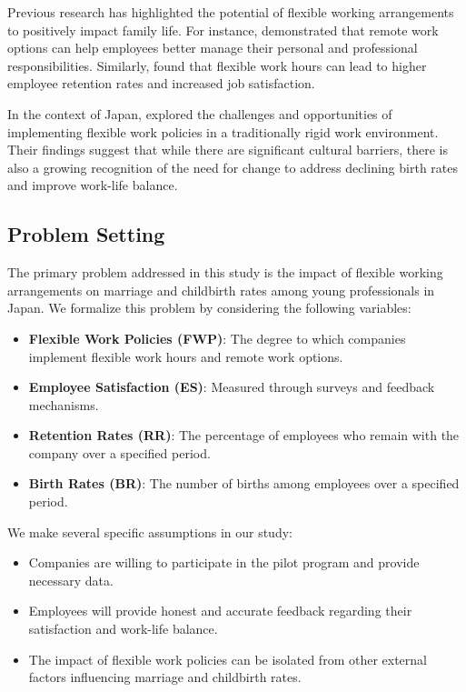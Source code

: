 \documentclass{article} %
\begin{document}
Previous research has highlighted the potential of flexible working arrangements to positively impact family life. For instance, \citet{wang2023describe} demonstrated that remote work options can help employees better manage their personal and professional responsibilities. Similarly, \citet{liu2023agentbench} found that flexible work hours can lead to higher employee retention rates and increased job satisfaction.

In the context of Japan, \citet{poledna2023economic} explored the challenges and opportunities of implementing flexible work policies in a traditionally rigid work environment. Their findings suggest that while there are significant cultural barriers, there is also a growing recognition of the need for change to address declining birth rates and improve work-life balance.

\subsection{Problem Setting}
The primary problem addressed in this study is the impact of flexible working arrangements on marriage and childbirth rates among young professionals in Japan. We formalize this problem by considering the following variables:
\begin{itemize}
    \item \textbf{Flexible Work Policies (FWP)}: The degree to which companies implement flexible work hours and remote work options.
    \item \textbf{Employee Satisfaction (ES)}: Measured through surveys and feedback mechanisms.
    \item \textbf{Retention Rates (RR)}: The percentage of employees who remain with the company over a specified period.
    \item \textbf{Birth Rates (BR)}: The number of births among employees over a specified period.
\end{itemize}

We make several specific assumptions in our study:
\begin{itemize}
    \item Companies are willing to participate in the pilot program and provide necessary data.
    \item Employees will provide honest and accurate feedback regarding their satisfaction and work-life balance.
    \item The impact of flexible work policies can be isolated from other external factors influencing marriage and childbirth rates.
\end{itemize}
\end{document}
